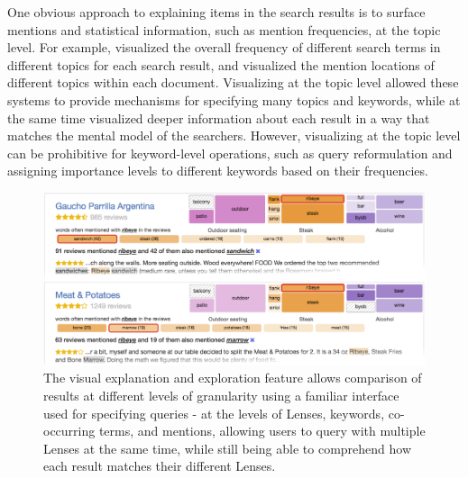 \documentclass{sigchi}
\begin{document}
One obvious approach to explaining items in the search results is to surface mentions and statistical information, such as mention frequencies, at the topic level. For example, \cite{hoeber2006comparative} visualized the overall frequency of different search terms in different topics for each search result, and \cite{hearst1996visualizing} visualized the mention locations of different topics within each document. Visualizing at the topic level allowed these systems to provide mechanisms for specifying many topics and keywords, while at the same time visualized deeper information about each result in a way that matches the mental model of the searchers. However, visualizing at the topic level can be prohibitive for keyword-level operations, such as query reformulation and assigning importance levels to different keywords based on their frequencies.

\begin{figure}[]
    \centering
    \includegraphics[width=1\columnwidth]{figures/compare2.png}
    \caption{The visual explanation and exploration feature allows comparison of results at different levels of granularity using a familiar interface used for specifying queries - at the levels of Lenses, keywords, co-occurring terms, and mentions, allowing users to query with multiple Lenses at the same time, while still being able to comprehend how each result matches their different Lenses.}
    \label{fig:compare}
\end{figure}
\end{document}
